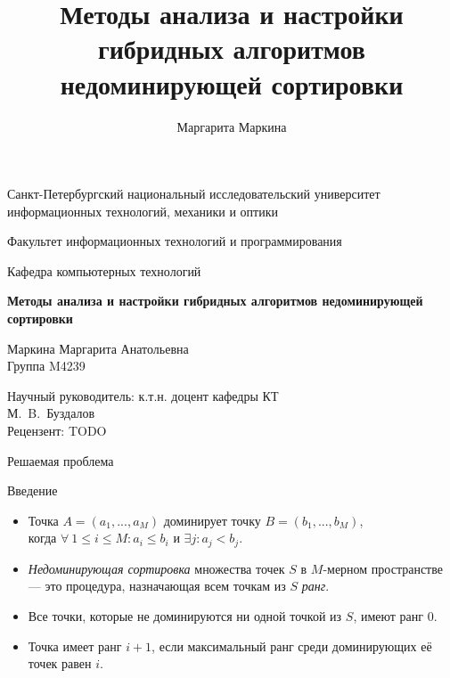 \documentclass[table]{beamer}
\title[Недоминирующая сортировка]{Методы анализа и настройки гибридных алгоритмов недоминирующей сортировки}
\author[Маргарита Маркина]{Маргарита Маркина}
\institute[]{Национальный исследовательский университет информационных технологий, механики и оптики}
\date{}
\begin{document}
\begin{frame}
\begin{center}
{\scriptsize Санкт-Петербургский национальный исследовательский университет \\ информационных технологий, механики и оптики}

\vspace{1cm}

{\scriptsize Факультет информационных технологий и программирования

Кафедра компьютерных технологий}

\vspace{1cm}

\vbox{\large\bfseries
Методы анализа и настройки гибридных алгоритмов недоминирующей сортировки}

\vspace{1cm}

{\large Маркина Маргарита Анатольевна \\}
{\large Группа M4239}

\vspace{1cm}

{\large Научный руководитель: к.т.н. доцент кафедры КТ \\}
{\large М.~B.~Буздалов \\}
{\large Рецензент: TODO}

\end{center}
\end{frame}


\begin{frame}{Решаемая проблема}
\begin{block}{Введение}
\begin{itemize}
\item Точка $A=(a_1,...,a_M)$ доминирует точку $B=(b_1,...,b_M)$, \\
когда $\forall ~ 1 \leq i \leq M : a_i \leq b_i$ и $\exists j : a_j < b_j $.
\item \textit{Недоминирующая сортировка} множества точек $S$ в $M$-мерном пространстве — это процедура, назначающая всем точкам из $S$ \textit{ранг}.
\item Все точки, которые не доминируются ни одной точкой из $S$, имеют ранг 0.
\item Точка имеет ранг $i+1$, если максимальный ранг среди доминирующих  её точек равен $i$.
\end{itemize}
\end{block}
\end{frame}
\end{document}
